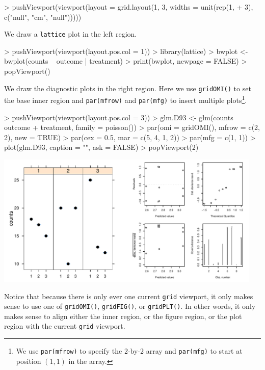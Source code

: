\documentclass[a4paper]{article}
\newcommand{\grid}{{\tt grid}}
\newcommand{\lattice}{{\tt lattice}}
\begin{document}
\begin{Schunk}
\begin{Sinput}
> pushViewport(viewport(layout = grid.layout(1, 3, widths = unit(rep(1, 
+     3), c("null", "cm", "null")))))
\end{Sinput}
\end{Schunk}
We draw a \lattice{} plot in the left region.

\begin{Schunk}
\begin{Sinput}
> pushViewport(viewport(layout.pos.col = 1))
> library(lattice)
> bwplot <- bwplot(counts ~ outcome | treatment)
> print(bwplot, newpage = FALSE)
> popViewport()
\end{Sinput}
\end{Schunk}
We draw the diagnostic plots in the right region.  Here
we use \verb|gridOMI()| to set the base inner region and
\verb|par(mfrow)| and 
\verb|par(mfg)| to insert multiple plots\footnote{We use
{\tt par(mfrow)} to specify the 2-by-2 array
and {\tt par(mfg)} to start at position $(1,1)$ in the 
array.}.

\begin{Schunk}
\begin{Sinput}
> pushViewport(viewport(layout.pos.col = 3))
> glm.D93 <- glm(counts ~ outcome + treatment, family = poisson())
> par(omi = gridOMI(), mfrow = c(2, 2), new = TRUE)
> par(cex = 0.5, mar = c(5, 4, 1, 2))
> par(mfg = c(1, 1))
> plot(glm.D93, caption = "", ask = FALSE)
> popViewport(2)
\end{Sinput}
\end{Schunk}
\includegraphics[width=5in]{gridBase-multiplot}

Notice that because there is only ever one current \grid{} viewport, it only 
makes sense to use one of \verb|gridOMI()|, \verb|gridFIG()|, or
\verb|gridPLT()|.  In other words, it only makes sense to 
align either the inner region, or the figure region, or the plot
region with the current \grid{} viewport.
\end{document}
